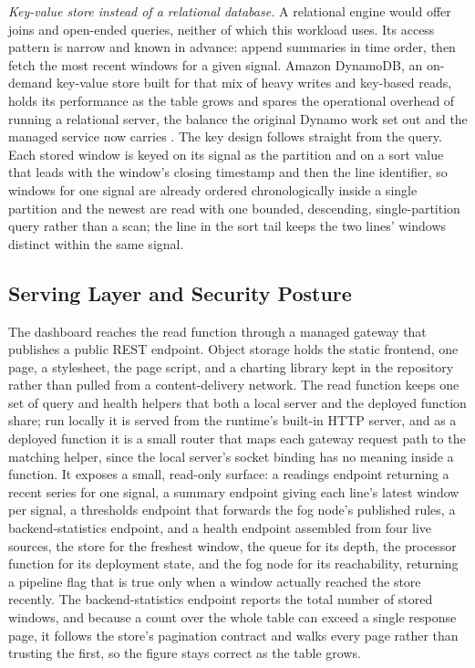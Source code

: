 \documentclass[conference]{IEEEtran}
\begin{document}
\textit{Key-value store instead of a relational database.} A relational engine would offer joins and open-ended queries, neither of which this workload uses. Its access pattern is narrow and known in advance: append summaries in time order, then fetch the most recent windows for a given signal. Amazon DynamoDB, an on-demand key-value store built for that mix of heavy writes and key-based reads, holds its performance as the table grows and spares the operational overhead of running a relational server, the balance the original Dynamo work set out and the managed service now carries \cite{decandia2007, elhemali2022}. The key design follows straight from the query. Each stored window is keyed on its signal as the partition and on a sort value that leads with the window's closing timestamp and then the line identifier, so windows for one signal are already ordered chronologically inside a single partition and the newest are read with one bounded, descending, single-partition query rather than a scan; the line in the sort tail keeps the two lines' windows distinct within the same signal.

\subsection{Serving Layer and Security Posture}

The dashboard reaches the read function through a managed gateway that publishes a public REST endpoint. Object storage holds the static frontend, one page, a stylesheet, the page script, and a charting library kept in the repository rather than pulled from a content-delivery network. The read function keeps one set of query and health helpers that both a local server and the deployed function share; run locally it is served from the runtime's built-in HTTP server, and as a deployed function it is a small router that maps each gateway request path to the matching helper, since the local server's socket binding has no meaning inside a function. It exposes a small, read-only surface: a readings endpoint returning a recent series for one signal, a summary endpoint giving each line's latest window per signal, a thresholds endpoint that forwards the fog node's published rules, a backend-statistics endpoint, and a health endpoint assembled from four live sources, the store for the freshest window, the queue for its depth, the processor function for its deployment state, and the fog node for its reachability, returning a pipeline flag that is true only when a window actually reached the store recently. The backend-statistics endpoint reports the total number of stored windows, and because a count over the whole table can exceed a single response page, it follows the store's pagination contract and walks every page rather than trusting the first, so the figure stays correct as the table grows.
\end{document}
